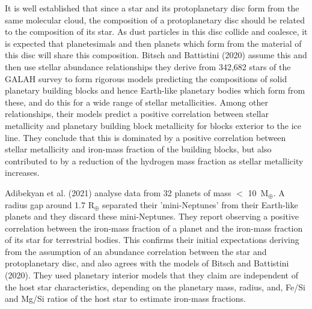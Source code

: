 \documentclass[a4paper,twocolumn,12pt]{article}
\begin{document}
It is well established that since a star and its protoplanetary disc form from the same molecular cloud, the composition of a protoplanetary disc should be related to the composition of its star. As dust particles in this disc collide and coalesce, it is expected that planetesimals and then planets which form from the material of this disc will share this composition. %
Bitsch and Battistini (2020)\cite{Bitsch&BattistiniTheoreticalModel} assume this and then use stellar abundance relationships they derive from 342,682 stars of the GALAH survey to form rigorous models predicting the compositions of solid planetary building blocks and hence Earth-like planetary bodies which form from these, and do this for a wide range of stellar metallicities. Among other relationships, their models predict a positive correlation between stellar metallicity and planetary building block metallicity for blocks exterior to the ice line. They conclude that this is dominated by a positive correlation between stellar metallicity and iron-mass fraction of the building blocks, but also contributed to by a reduction of the hydrogen mass fraction as stellar metallicity increases.



Adibekyan et al. (2021)\cite{Adibekyan} analyse data from 32 planets of mass $<$ 10~M$_\oplus$. A radius gap around 1.7 R$_\oplus$ separated their 'mini-Neptunes' from their Earth-like planets and they discard these mini-Neptunes. They report observing a positive correlation between the iron-mass fraction of a planet and the iron-mass fraction of its star for terrestrial bodies. This confirms their initial expectations deriving from the assumption of an abundance correlation between the star and protoplanetary disc, and also agrees with the models of Bitsch and Battistini (2020). They used planetary interior models that they
claim are independent of the host star characteristics, depending on the planetary mass, radius, and, Fe/Si and Mg/Si ratios of the host star \cite{SussyInteriorModelsSuper-EarthsAndSub-Neptunes} to estimate iron-mass fractions.
\end{document}
